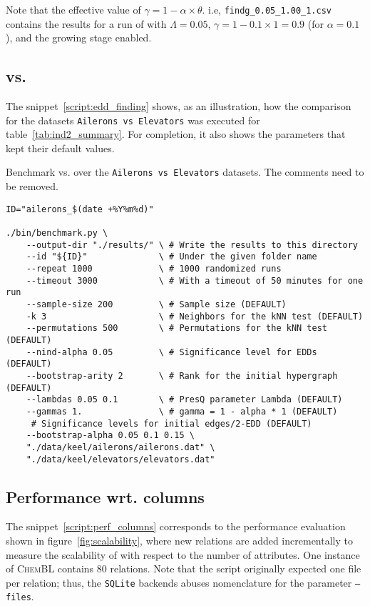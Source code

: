 Note that the effective value of $\gamma = 1 -\alpha \times \theta$. i.e, \texttt{findg\_0.05\_1.00\_1.csv} contains
the results for a run of \PresQ with $\Lambda = 0.05$, $\gamma = 1 - 0.1 \times 1 = 0.9$ (for $\alpha = 0.1$),
and the growing stage enabled.

\subsection{\Find vs. \PresQ}

The snippet~\ref{script:edd_finding} shows, as an illustration, how the comparison for the
datasets \texttt{Ailerons vs Elevators} was executed for table~\ref{tab:ind2_summary}.
For completion, it also shows the parameters that kept their default values.

\begin{code}
\caption{Benchmark \Find vs. \PresQ over the \texttt{Ailerons vs Elevators} datasets. The comments need to be removed.}\label{script:edd_finding}
\begin{verbatim}
ID="ailerons_$(date +%Y%m%d)"

./bin/benchmark.py \
    --output-dir "./results/" \ # Write the results to this directory
    --id "${ID}"              \ # Under the given folder name
    --repeat 1000             \ # 1000 randomized runs
    --timeout 3000            \ # With a timeout of 50 minutes for one run
    --sample-size 200         \ # Sample size (DEFAULT)
    -k 3                      \ # Neighbors for the kNN test (DEFAULT)
    --permutations 500        \ # Permutations for the kNN test (DEFAULT)
    --nind-alpha 0.05         \ # Significance level for EDDs (DEFAULT)
    --bootstrap-arity 2       \ # Rank for the initial hypergraph (DEFAULT)
    --lambdas 0.05 0.1        \ # PresQ parameter Lambda (DEFAULT)
    --gammas 1.               \ # gamma = 1 - alpha * 1 (DEFAULT)
     # Significance levels for initial edges/2-EDD (DEFAULT)
    --bootstrap-alpha 0.05 0.1 0.15 \
    "./data/keel/ailerons/ailerons.dat" \
    "./data/keel/elevators/elevators.dat"
\end{verbatim}
\end{code}

\subsection{Performance wrt. columns}

The snippet~\ref{script:perf_columns} corresponds to the performance evaluation shown
in figure~\ref{fig:scalability}, where new relations are added incrementally to measure
the scalability of \PresQ with respect to the number of attributes.
One instance of \textsc{ChemBL} contains 80 relations. Note that the script
originally expected one file per relation; thus, the \texttt{SQLite} backends abuses
nomenclature for the parameter \texttt{--files}.

